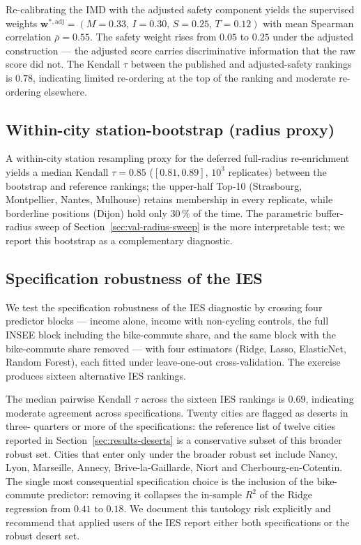 \documentclass[11pt,a4paper]{article}
\begin{document}
Re-calibrating the IMD with the adjusted safety component yields
the supervised weights $\mathbf{w}^{\ast,\text{adj}} =
(M = 0.33,\, I = 0.30,\, S = 0.25,\, T = 0.12)$ with mean
Spearman correlation $\bar\rho = 0.55$. The safety weight rises
from $0.05$ to $0.25$ under the adjusted construction --- the
adjusted score carries discriminative information that the raw
score did not. The Kendall $\tau$ between the published and
adjusted-safety rankings is $0.78$, indicating limited
re-ordering at the top of the ranking and moderate re-ordering
elsewhere.

\subsection{Within-city station-bootstrap (radius proxy)}
\label{sec:val-radius}

A within-city station resampling proxy for the deferred
full-radius re-enrichment yields a median Kendall $\tau = 0.85$
($[0.81, 0.89]$, $10^{3}$ replicates) between the bootstrap and
reference rankings; the upper-half Top-10 (Strasbourg,
Montpellier, Nantes, Mulhouse) retains membership in every
replicate, while borderline positions (Dijon) hold only $30\,\%$
of the time. The parametric buffer-radius sweep of
Section~\ref{sec:val-radius-sweep} is the more interpretable
test; we report this bootstrap as a complementary diagnostic.

\subsection{Specification robustness of the IES}
\label{sec:val-ies}

We test the specification robustness of the IES diagnostic by
crossing four predictor blocks --- income alone, income with
non-cycling controls, the full INSEE block including the
bike-commute share, and the same block with the bike-commute
share removed --- with four estimators (Ridge, Lasso, ElasticNet,
Random Forest), each fitted under leave-one-out cross-validation.
The exercise produces sixteen alternative IES rankings.

The median pairwise Kendall $\tau$ across the sixteen IES
rankings is $0.69$, indicating moderate agreement across
specifications. Twenty cities are flagged as deserts in three-
quarters or more of the specifications: the reference list of
twelve cities reported in Section~\ref{sec:results-deserts} is a
conservative subset of this broader robust set. Cities that enter
only under the broader robust set include Nancy, Lyon, Marseille,
Annecy, Brive-la-Gaillarde, Niort and Cherbourg-en-Cotentin. The
single most consequential specification choice is the inclusion
of the bike-commute predictor: removing it collapses the
in-sample $R^{2}$ of the Ridge regression from $0.41$ to $0.18$.
We document this tautology risk explicitly and recommend that
applied users of the IES report either both specifications or
the robust desert set.
\end{document}
